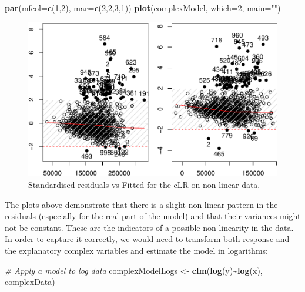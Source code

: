 \documentclass[
]{book}
\newenvironment{Shaded}{\begin{snugshade}}{\end{snugshade}}
\newcommand{\CommentTok}[1]{\textcolor[rgb]{0.56,0.35,0.01}{\textit{#1}}}
\newcommand{\DataTypeTok}[1]{\textcolor[rgb]{0.13,0.29,0.53}{#1}}
\newcommand{\DecValTok}[1]{\textcolor[rgb]{0.00,0.00,0.81}{#1}}
\newcommand{\KeywordTok}[1]{\textcolor[rgb]{0.13,0.29,0.53}{\textbf{#1}}}
\newcommand{\NormalTok}[1]{#1}
\newcommand{\OperatorTok}[1]{\textcolor[rgb]{0.81,0.36,0.00}{\textbf{#1}}}
\newcommand{\StringTok}[1]{\textcolor[rgb]{0.31,0.60,0.02}{#1}}
\begin{document}
\begin{Shaded}
\begin{Highlighting}[]
\KeywordTok{par}\NormalTok{(}\DataTypeTok{mfcol=}\KeywordTok{c}\NormalTok{(}\DecValTok{1}\NormalTok{,}\DecValTok{2}\NormalTok{), }\DataTypeTok{mar=}\KeywordTok{c}\NormalTok{(}\DecValTok{2}\NormalTok{,}\DecValTok{2}\NormalTok{,}\DecValTok{3}\NormalTok{,}\DecValTok{1}\NormalTok{))}
\KeywordTok{plot}\NormalTok{(complexModel, }\DataTypeTok{which=}\DecValTok{2}\NormalTok{, }\DataTypeTok{main=}\StringTok{""}\NormalTok{)}
\end{Highlighting}
\end{Shaded}

\begin{figure}
\centering
\includegraphics{Svetunkov---Svetunkov---Complex-Valued-Econometrics_files/figure-latex/nonlinearLinStdResid-1.pdf}
\caption{\label{fig:nonlinearLinStdResid}Standardised residuals vs Fitted for the cLR on non-linear data.}
\end{figure}

The plots above demonstrate that there is a slight non-linear pattern in the residuals (especially for the real part of the model) and that their variances might not be constant. These are the indicators of a possible non-linearity in the data. In order to capture it correctly, we would need to transform both response and the explanatory complex variables and estimate the model in logarithms:

\begin{Shaded}
\begin{Highlighting}[]
\CommentTok{\# Apply a model to log data}
\NormalTok{complexModelLogs \textless{}{-}}\StringTok{ }\KeywordTok{clm}\NormalTok{(}\KeywordTok{log}\NormalTok{(y)}\OperatorTok{\textasciitilde{}}\KeywordTok{log}\NormalTok{(x), complexData)}
\end{Highlighting}
\end{Shaded}
\end{document}
